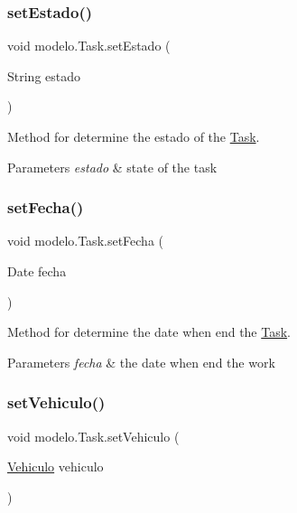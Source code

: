 \subsubsection{\texorpdfstring{set\+Estado()}{setEstado()}}
{\footnotesize\ttfamily void modelo.\+Task.\+set\+Estado (\begin{DoxyParamCaption}\item[{String}]{estado }\end{DoxyParamCaption})}



Method for determine the estado of the \mbox{\hyperlink{classmodelo_1_1_task}{Task}}. 


\begin{DoxyParams}{Parameters}
{\em estado} & state of the task \\
\hline
\end{DoxyParams}
\mbox{\label{classmodelo_1_1_task_af78482329f81c214c6359630ea077179}} 
\subsubsection{\texorpdfstring{set\+Fecha()}{setFecha()}}
{\footnotesize\ttfamily void modelo.\+Task.\+set\+Fecha (\begin{DoxyParamCaption}\item[{Date}]{fecha }\end{DoxyParamCaption})}



Method for determine the date when end the \mbox{\hyperlink{classmodelo_1_1_task}{Task}}. 


\begin{DoxyParams}{Parameters}
{\em fecha} & the date when end the work \\
\hline
\end{DoxyParams}
\mbox{\label{classmodelo_1_1_task_a9303b782e49cabf729418196a2712ba0}} 
\subsubsection{\texorpdfstring{set\+Vehiculo()}{setVehiculo()}}
{\footnotesize\ttfamily void modelo.\+Task.\+set\+Vehiculo (\begin{DoxyParamCaption}\item[{\mbox{\hyperlink{classmodelo_1_1_vehiculo}{Vehiculo}}}]{vehiculo }\end{DoxyParamCaption})}



